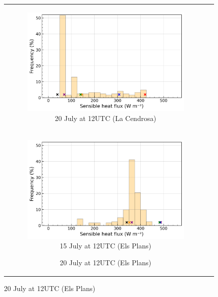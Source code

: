 \begin{figure}[hbtp]
{\begin{tabular}{cc}
\begin{subfigure}[t]{0.48\textwidth}
        \end{subfigure}
        \begin{subfigure}[t]{0.48\textwidth}
            \caption{20 July at 12UTC (La Cendrosa)}
            \includegraphics[width=\textwidth]{images/chap6/IOP_bins/bins_sens_2021-07-20T12:00:00_cendrosa.png}
        \end{subfigure} \\
        \begin{subfigure}[t]{0.48\textwidth}
            \caption{15 July at 12UTC (Els Plans)}
            \includegraphics[width=\textwidth]{images/chap6/IOP_bins/bins_sens_2021-07-15T12:00:00_elsplans.png}
        \end{subfigure}
        \begin{subfigure}[t]{0.48\textwidth}
            \caption{20 July at 12UTC (Els Plans)}

\end{subfigure}
\end{tabular}}
\end{figure}
